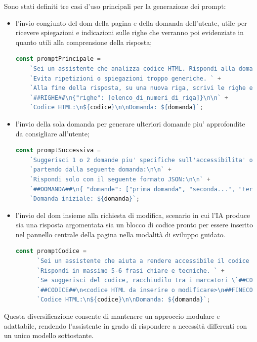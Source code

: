 \noindent Sono stati definiti tre casi d’uso principali per la generazione dei prompt: 
\begin{itemize}
    \item l’invio congiunto del \acrshort{dom} della pagina e della domanda dell’utente, utile per ricevere spiegazioni e indicazioni sulle righe che verranno poi evidenziate in quanto utili alla comprensione della risposta; 
    \begin{lstlisting}[language=JavaScript, caption={Prompt per la generazione di risposta e righe da evidenziare}]
    const promptPrincipale =
    `Sei un assistente che analizza codice HTML. Rispondi alla domanda in modo chiaro ma conciso, usando al massimo 5-6 frasi. ` +
    `Evita ripetizioni o spiegazioni troppo generiche. ` +
    `Alla fine della risposta, su una nuova riga, scrivi le righe eventualmente utilizzate per la risposta nel seguente formato:\n\n` +
    `##RIGHE##\n{"righe": [elenco_di_numeri_di_riga]}\n\n` +
    `Codice HTML:\n${codice}\n\nDomanda: ${domanda}`;
    \end{lstlisting}
    
    \item l'invio della sola domanda per generare ulteriori domande piu' approfondite da consigliare all'utente;
    \begin{lstlisting}[language=JavaScript, caption={Prompt per la generazione di domande successive}]
    const promptSuccessiva =
    `Suggerisci 1 o 2 domande piu' specifiche sull'accessibilita' o sull'analisi del codice, ` +
    `partendo dalla seguente domanda:\n\n` +
    `Rispondi solo con il seguente formato JSON:\n\n` +
    `##DOMANDA##\n{ "domande": ["prima domanda", "seconda...", "terza..."] }\n\n` +
    `Domanda iniziale: ${domanda}`;
    \end{lstlisting}

    
    \item l’invio del \acrshort{dom} insieme alla richiesta di modifica, scenario in cui l’IA produce sia una risposta argomentata sia un blocco di codice pronto per essere inserito nel pannello centrale della pagina nella modalità di sviluppo guidato.
    \begin{lstlisting}[language=JavaScript, caption={Prompt per la generazione di risposta e codice \acrshort{html} accessibile}]
    const promptCodice =
      `Sei un assistente che aiuta a rendere accessibile il codice HTML. ` +
      `Rispondi in massimo 5-6 frasi chiare e tecniche. ` +
      `Se suggerisci del codice, racchiudilo tra i marcatori \`##CODICE##\` come mostrato di seguito:\n\n` +
      `##CODICE##\n<codice HTML da inserire o modificare>\n##FINECODICE##\n\n` +
      `Codice HTML:\n${codice}\n\nDomanda: ${domanda}`;
    \end{lstlisting}

\end{itemize}
Questa diversificazione consente di mantenere un approccio modulare e adattabile, rendendo l’assistente in grado di rispondere a necessità differenti con un unico modello sottostante.


